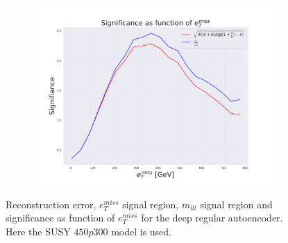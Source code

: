 \begin{figure}[H]
    \hfill  
    \begin{subfigure}{.60\textwidth}
        \includegraphics[width=\textwidth]{Figures/AE_testing/small/2lep/significance_etmiss_450p0p0300_-1.7167506533614734.pdf}
        \caption{}
        \label{fig:AE_2lep_small_signi_450}
    \end{subfigure}
    \hfill      
    \caption[2lep shallow network | $450p300$ | AE]{Reconstruction error, $e_T^{miss}$ signal region, $m_{lll}$ signal region and significance as function of 
    $e_T^{miss}$ for the deep regular autoencoder. Here the SUSY $450p300$ model is used.}
    \label{fig:AE_2lep_small_rec_sig_signi_450}
\end{figure}


